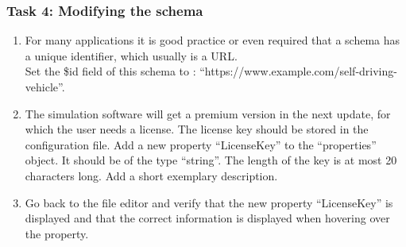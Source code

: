 \subsubsection{Task 4: Modifying the schema}
\begin{enumerate}
    \item For many applications it is good practice or even required that a schema has a unique identifier, which usually is a URL.
          \\Set the \$id field of this schema to : ``https://www.example.com/self-driving-vehicle''.
    \item The simulation software will get a premium version in the next update, for which the user needs a license.
          The license key should be stored in the configuration file.
          Add a new property ``LicenseKey'' to the ``properties'' object.
          It should be of the type ``string''.
          The length of the key is at most 20 characters long.
    Add a short exemplary description.
    \item Go back to the file editor and verify that the new property ``LicenseKey'' is displayed and that the correct information is displayed when hovering over the property.
\end{enumerate}






